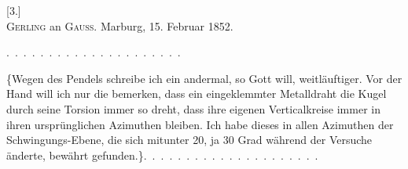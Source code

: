 \clearpage\begingroup{}
\begin{center}
[3.]\\[.7em]
\textsc{Gerling} an \textsc{Gauss}. Marburg, 15. Februar 1852.
\end{center}
\noindent .\ .\ .\ .\ .\ .\ .\ .\ .\ .\ .\ .\ .\ .\ .\ .\ .\ .\ .\ .\ .
\par\noindent\hspace*{\parindent}\{Wegen des Pendels schreibe ich ein andermal, so Gott will, weitläuftiger.
Vor der Hand will ich nur die  bemerken, dass ein 
eingeklemmter Metalldraht die Kugel durch seine Torsion immer so
dreht, dass ihre eigenen Verticalkreise immer in ihren ursprünglichen Azimuthen
bleiben. Ich habe dieses in allen Azimuthen der Schwingungs-Ebene,
die sich mitunter 20, ja 30 Grad während der Versuche änderte, bewährt
gefunden.\}\quad .\ .\ .\ .\ .\ .\ .\ .\ .\ .\ .\ .\ .\ .\ .\ .\ .\ .\ .\ .\ .
\clearpage\endgroup
